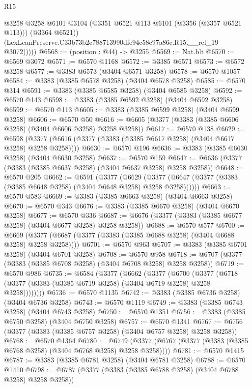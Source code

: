 \begin{lexlean}{R15}
\begin{coremodule}
              @3258
              @3258
              @6101
              @3104
              (@3351 @6521 @113 @6101 (@3356 (@3357 @6521 @113)))
              (@3364 @6521))
            (LexLeanPreserve.C33b73b2e788713990dfe94c58c97a86e.R15.__rel_19 @3072)))))
@6568 := (position : @44) -> @3255
@6569 := Nat.blt
@6570 := @6569 @3072
@6571 := @6570 @1168
@6572 := @3385 @6571
@6573 := @6572 @3258
@6577 := @3383 @6573 (@3404 @6571 @3258)
@6578 := @6570 @1057
@6584 := @3383 (@3385 @6578 @3258) (@3404 @6578 @3258)
@6585 := @6570 @314
@6591 := @3383 (@3385 @6585 @3258) (@3404 @6585 @3258)
@6592 := @6570 @143
@6598 := @3383 (@3385 @6592 @3258) (@3404 @6592 @3258)
@6599 := @6570 @113
@6605 := @3383 (@3385 @6599 @3258) (@3404 @6599 @3258)
@6606 := @6570 @50
@6616 := @6605 (@3377 (@3383 (@3385 @6606 @3258) (@3404 @6606 @3258) @3258 @3258))
@6617 := @6570 @138
@6629 := @6598 (@3377 (@6616 (@3377 (@3383 (@3385 @6617 @3258) (@3404 @6617 @3258) @3258 @3258))))
@6630 := @6570 @196
@6636 := @3383 (@3385 @6630 @3258) (@3404 @6630 @3258)
@6637 := @6570 @159
@6647 := @6636 (@3377 (@3383 (@3385 @6637 @3258) (@3404 @6637 @3258) @3258 @3258))
@6648 := @6570 @205
@6662 := @6591
    (@3377
      (@6629 (@3377 (@6647 (@3377 (@3383 (@3385 @6648 @3258) (@3404 @6648 @3258) @3258 @3258))))))
@6663 := @6570 @583
@6669 := @3383 (@3385 @6663 @3258) (@3404 @6663 @3258)
@6670 := @6570 @343
@6676 := @3383 (@3385 @6670 @3258) (@3404 @6670 @3258)
@6677 := @6570 @336
@6687 := @6676 (@3377 (@3383 (@3385 @6677 @3258) (@3404 @6677 @3258) @3258 @3258))
@6688 := @6570 @577
@6700 := @6669 (@3377 (@6687 (@3377 (@3383 (@3385 @6688 @3258) (@3404 @6688 @3258) @3258 @3258))))
@6701 := @6570 @963
@6707 := @3383 (@3385 @6701 @3258) (@3404 @6701 @3258)
@6708 := @6570 @958
@6718 := @6707 (@3377 (@3383 (@3385 @6708 @3258) (@3404 @6708 @3258) @3258 @3258))
@6719 := @6570 @986
@6735 := @6584
    (@3377
      (@6662
        (@3377
          (@6700
            (@3377 (@6718 (@3377 (@3383 (@3385 @6719 @3258) (@3404 @6719 @3258) @3258 @3258))))))))
@6736 := @6570 @1135
@6742 := @3383 (@3385 @6736 @3258) (@3404 @6736 @3258)
@6743 := @6570 @1119
@6749 := @3383 (@3385 @6743 @3258) (@3404 @6743 @3258)
@6750 := @6570 @1351
@6756 := @3383 (@3385 @6750 @3258) (@3404 @6750 @3258)
@6757 := @6570 @1341
@6767 := @6756 (@3377 (@3383 (@3385 @6757 @3258) (@3404 @6757 @3258) @3258 @3258))
@6768 := @6570 @1364
@6780 := @6749 (@3377 (@6767 (@3377 (@3383 (@3385 @6768 @3258) (@3404 @6768 @3258) @3258 @3258))))
@6781 := @6570 @1415
@6787 := @3383 (@3385 @6781 @3258) (@3404 @6781 @3258)
@6788 := @6570 @1410
@6798 := @6787 (@3377 (@3383 (@3385 @6788 @3258) (@3404 @6788 @3258) @3258 @3258))

\end{coremodule}
\end{lexlean}
